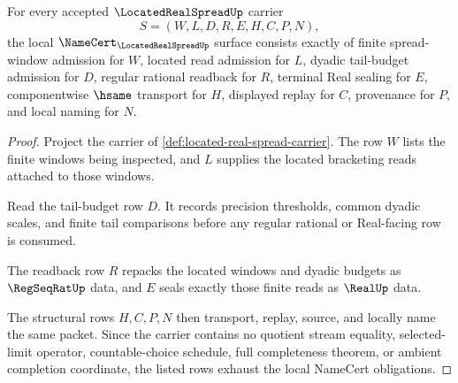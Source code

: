 \begin{theorem}
\label{thm:located-real-spread-namecert-obligations}
For every accepted $\LocatedRealSpreadUp$ carrier
$$
S=(W,L,D,R,E,H,C,P,N),
$$
the local $\NameCert_{\LocatedRealSpreadUp}$ surface consists exactly of finite spread-window admission for $W$, located read admission for $L$, dyadic tail-budget admission for $D$, regular rational readback for $R$, terminal Real sealing for $E$, componentwise $\hsame$ transport for $H$, displayed replay for $C$, provenance for $P$, and local naming for $N$.
\end{theorem}
\begin{proof}
Project the carrier of \autoref{def:located-real-spread-carrier}. The row $W$ lists the finite windows being inspected, and $L$ supplies the located bracketing reads attached to those windows.

Read the tail-budget row $D$. It records precision thresholds, common dyadic scales, and finite tail comparisons before any regular rational or Real-facing row is consumed.

The readback row $R$ repacks the located windows and dyadic budgets as $\RegSeqRatUp$ data, and $E$ seals exactly those finite reads as $\RealUp$ data.

The structural rows $H,C,P,N$ then transport, replay, source, and locally name the same packet. Since the carrier contains no quotient stream equality, selected-limit operator, countable-choice schedule, full completeness theorem, or ambient completion coordinate, the listed rows exhaust the local NameCert obligations.
\end{proof}

